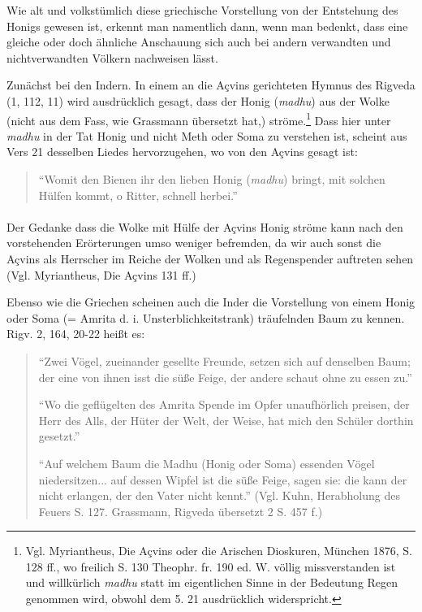 \documentclass[a4paper, 11pt, oneside]{article}
\begin{document}
Wie alt und volkstümlich diese griechische Vorstellung von der Entstehung des Honigs gewesen ist, erkennt man namentlich dann, wenn man bedenkt, dass eine gleiche oder doch ähnliche Anschauung sich auch bei andern verwandten und nichtverwandten Völkern nachweisen lässt.

Zunächst bei den Indern. In einem an die Açvins gerichteten Hymnus des Rigveda (1, 112, 11) wird ausdrücklich gesagt, dass der Honig (\emph{madhu}) aus der Wolke (nicht aus dem Fass, wie Grassmann übersetzt hat,) ströme.\footnote{Vgl. Myriantheus, Die Açvins oder die Arischen Dioskuren, München 1876, S. 128 ff., wo freilich S. 130 Theophr. fr. 190 ed. W. völlig missverstanden ist und willkürlich \emph{madhu} statt im eigentlichen Sinne in der Bedeutung Regen genommen wird, obwohl dem 5. 21 ausdrücklich widerspricht.} Dass hier unter \emph{madhu} in der Tat Honig und nicht Meth oder Soma zu verstehen ist, scheint aus Vers 21 desselben Liedes hervorzugehen, wo von den Açvins gesagt ist:
\begin{quotation}
"`Womit den Bienen ihr den lieben Honig (\emph{madhu}) bringt, mit solchen Hülfen kommt, o Ritter, schnell herbei."'
\end{quotation}
\paragraph{}
Der Gedanke dass die Wolke mit Hülfe der Açvins Honig ströme kann nach den vorstehenden Erörterungen umso weniger befremden, da wir auch sonst die Açvins als Herrscher im Reiche der Wolken und als Regenspender auftreten sehen (Vgl. Myriantheus, Die Açvins 131 ff.)

Ebenso wie die Griechen scheinen auch die Inder die Vorstellung von einem Honig oder Soma (= Amrita d. i. Unsterblichkeitstrank) träufelnden Baum zu kennen. Rigv. 2, 164, 20-22 heißt es:
\begin{quotation}
"`Zwei Vögel, zueinander gesellte Freunde, setzen sich auf denselben Baum; der eine von ihnen isst die süße Feige, der andere schaut ohne zu essen zu."'

"`Wo die geflügelten des Amrita Spende im Opfer unaufhörlich preisen, der Herr des Alls, der Hüter der Welt, der Weise, hat mich den Schüler dorthin gesetzt."'

"`Auf welchem Baum die Madhu (Honig oder Soma) essenden Vögel niedersitzen... auf dessen Wipfel ist die süße Feige, sagen sie: die kann der nicht erlangen, der den Vater nicht kennt."' (Vgl. Kuhn, Herabholung des Feuers S. 127. Grassmann, Rigveda übersetzt 2 S. 457 f.)
\end{quotation}
\end{document}
